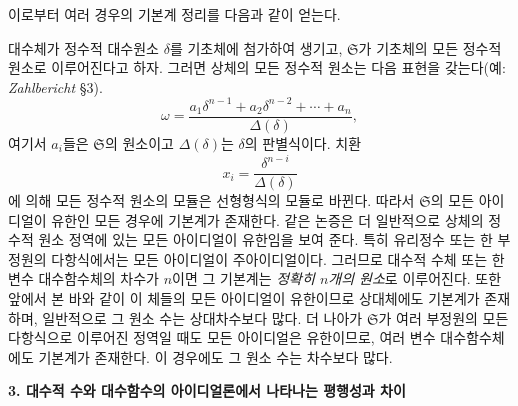 이로부터 여러 경우의 기본계 정리를 다음과 같이 얻는다.

대수체가 정수적 대수원소 \(\delta\)를 기초체에 첨가하여 생기고, \(\mathfrak S\)가 기초체의 모든 정수적 원소로 이루어진다고 하자. 그러면 상체의 모든 정수적 원소는 다음 표현을 갖는다(예: \emph{Zahlbericht} \S{}3).
\[
\omega=\frac{a_1\delta^{n-1}+a_2\delta^{n-2}+\cdots+a_n}{\Delta(\delta)},
\]
여기서 \(a_i\)들은 \(\mathfrak S\)의 원소이고 \(\Delta(\delta)\)는 \(\delta\)의 판별식이다. 치환
\[
x_i=\frac{\delta^{n-i}}{\Delta(\delta)}
\]
에 의해 모든 정수적 원소의 모듈은 선형형식의 모듈로 바뀐다. 따라서 \(\mathfrak S\)의 모든 아이디얼이 유한인 모든 경우에 기본계가 존재한다. 같은 논증은 더 일반적으로 상체의 정수적 원소 정역에 있는 모든 아이디얼이 유한임을 보여 준다. 특히 유리정수 또는 한 부정원의 다항식에서는 모든 아이디얼이 주아이디얼이다. 그러므로 대수적 수체 또는 한 변수 대수함수체의 차수가 \(n\)이면 그 기본계는 \emph{정확히 \(n\)개의 원소}로 이루어진다. 또한 앞에서 본 바와 같이 이 체들의 모든 아이디얼이 유한이므로 상대체에도 기본계가 존재하며, 일반적으로 그 원소 수는 상대차수보다 많다. 더 나아가 \(\mathfrak S\)가 여러 부정원의 모든 다항식으로 이루어진 정역일 때도 모든 아이디얼은 유한이므로, 여러 변수 대수함수체에도 기본계가 존재한다. 이 경우에도 그 원소 수는 차수보다 많다.

\begin{center}
\textbf{3. 대수적 수와 대수함수의 아이디얼론에서 나타나는 평행성과 차이}
\end{center}

